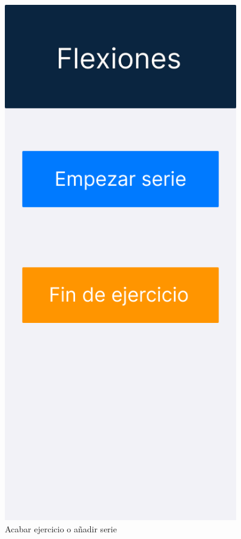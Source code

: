 \begin{figure}[H]
\begin{minipage}{0.45\textwidth}
      \label{fig:Fin de la serie(Descanso completado)}
   \end{minipage}%
   \hspace{0.5cm}
   \begin{minipage}{0.45\textwidth}
      \centering
      \includegraphics[width=0.9\textwidth]{fotos/Frame 62.png}
      \caption{Acabar ejercicio o añadir serie}
      \label{fig:Acabar ejercicio o añadir serie}
   \end{minipage}
\end{figure}

